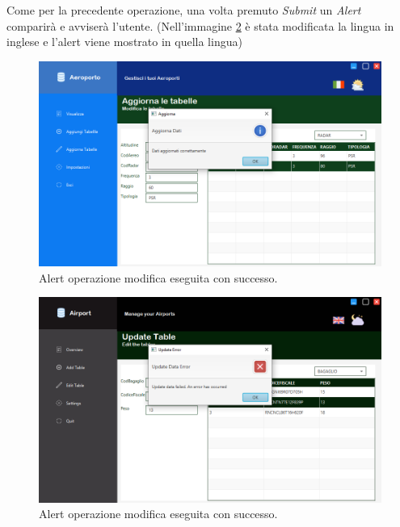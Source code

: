 \pagebreak

\enlargethispage{1\linewidth}

\textsf{\small Come per la precedente operazione, una volta premuto \emph{Submit} un \emph{Alert} comparirà e avviserà l'utente. (Nell'immagine \ref{fig:edit_table_alert_error} è stata modificata la lingua in inglese e l'alert viene mostrato in quella lingua)}\\

\begin{figure}[H] 
	\centering
	\includegraphics[width=1\textwidth, height=1\textheight, keepaspectratio]{./img/Applicativo/edit_table_alert.png}
	\caption{Alert operazione modifica eseguita con successo.}
	\label{fig:edit_table_alert_success}
\end{figure}

\begin{figure}[H] 
	\centering
	\includegraphics[width=1\textwidth, height=1\textheight, keepaspectratio]{./img/Applicativo/edit_table_alert_error.png}
	\caption{Alert operazione modifica eseguita con successo.}
	\label{fig:edit_table_alert_error}
\end{figure}

